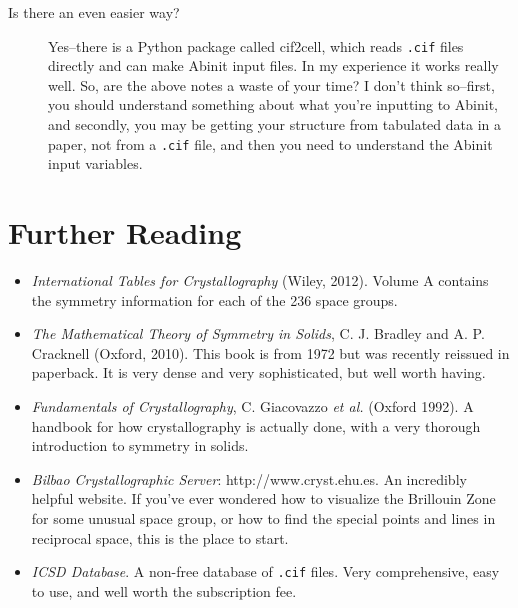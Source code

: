 \documentclass{article}
\begin{document}
\begin{description}
\item[Is there an even easier way?] Yes--there is a {\sc Python} package called {\sc cif2cell}, which reads {\tt .cif} files
directly and can make {\sc Abinit} input files. In my experience it works really well. So, are the above notes a waste of your
time? I don't think so--first, you should understand something about what you're inputting to {\sc Abinit}, and secondly, you may
be getting your structure from tabulated data in a paper, not from a {\tt .cif} file, and then you need to understand the
{\sc Abinit} input variables.

\end{description}

\section{Further Reading}
\begin{itemize}
\item {\em International Tables for Crystallography} (Wiley, 2012). Volume A contains the symmetry information for each of the
236 space groups.

\item {\em The Mathematical Theory of Symmetry in Solids}, C. J. Bradley and A. P. Cracknell (Oxford, 2010). This book is from
1972 but was recently reissued in paperback. It is very dense and very sophisticated, but well worth having.

\item {\em Fundamentals of Crystallography}, C. Giacovazzo {\em et al.} (Oxford 1992). A handbook for how crystallography is
actually done, with a very thorough introduction to symmetry in solids.

\item {\em Bilbao Crystallographic Server}: http://www.cryst.ehu.es. An incredibly helpful website. If you've ever wondered how
to visualize the Brillouin Zone for some unusual space group, or how to find the special points and lines in reciprocal space,
this is the place to start.

\item {\em ICSD Database}. A non-free database of {\tt .cif} files. Very comprehensive, easy to use, and well worth the subscription
fee.

\end{itemize}
\end{document}

